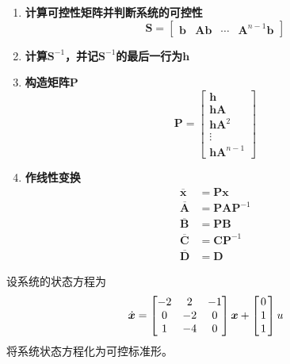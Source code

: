 \example[可控系统方程转换为标准形式]
\vspace*{-1.5em}
\begin{enumerate}[\textbf{步骤} 1 ]
	\item \textbf{计算可控性矩阵并判断系统的可控性}
	\begin{equation}
		\bm{S} = 
		\begin{bmatrix}
			\bm{b} & \bm{Ab} & \cdots & \bm{A}^{n-1}\bm{b}
		\end{bmatrix} 
	\end{equation}
	\item \textbf{计算$\bm{S}^{-1}$，并记$\bm{S}^{-1}$的最后一行为$\bm{h}$}
	\item \textbf{构造矩阵$\bm{P}$}
	\begin{equation}
		\bm{P} = 
		\begin{bmatrix}
			\bm{h}\\
			\bm{hA}\\
			\bm{hA}^2\\
			\vdots\\
			\bm{hA}^{n-1}
		\end{bmatrix}
	\end{equation}
	\item \textbf{作线性变换}
	\begin{align}
		\overline{\bm{x}} & = \bm{Px}\\
		\overline{\bm{A}} & = \bm{PAP}^{-1}\\
		\overline{\bm{B}} & = \bm{PB}\\
		\overline{\bm{C}} & = \bm{CP}^{-1}\\
		\overline{\bm{D}} & = \bm{D}
	\end{align}
\end{enumerate}

\examples 设系统的状态方程为
\begin{equation*}
	\dot{\bm{x}} = 
	\begin{bmatrix}
		-2 & 2 & -1\\
		0 & -2 & 0\\
		1 & -4 & 0
	\end{bmatrix}
	\bm{x} +
	\begin{bmatrix}
		\hspace*{0.5mm}0\hspace*{0.5mm}\\
		1\\
		1
	\end{bmatrix}
	u
\end{equation*}
将系统状态方程化为可控标准形。

